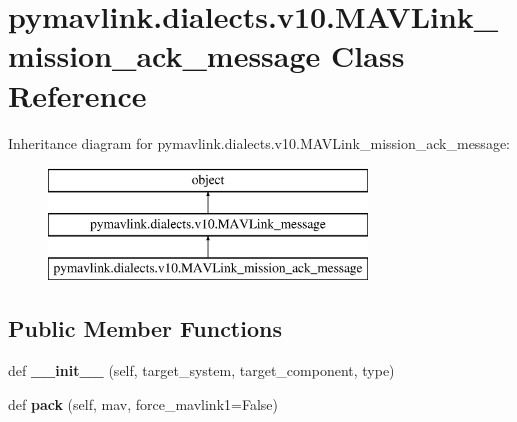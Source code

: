 \hypertarget{classpymavlink_1_1dialects_1_1v10_1_1MAVLink__mission__ack__message}{}\section{pymavlink.\+dialects.\+v10.\+M\+A\+V\+Link\+\_\+mission\+\_\+ack\+\_\+message Class Reference}
\label{classpymavlink_1_1dialects_1_1v10_1_1MAVLink__mission__ack__message}
Inheritance diagram for pymavlink.\+dialects.\+v10.\+M\+A\+V\+Link\+\_\+mission\+\_\+ack\+\_\+message\+:\begin{figure}[H]
\begin{center}
\leavevmode
\includegraphics[height=3.000000cm]{classpymavlink_1_1dialects_1_1v10_1_1MAVLink__mission__ack__message}
\end{center}
\end{figure}
\subsection*{Public Member Functions}
\begin{DoxyCompactItemize}
\item 
\mbox{\label{classpymavlink_1_1dialects_1_1v10_1_1MAVLink__mission__ack__message_ab05c68a5c8a7c002e9f042a15777d782}} 
def {\bfseries \+\_\+\+\_\+init\+\_\+\+\_\+} (self, target\+\_\+system, target\+\_\+component, type)
\item 
\mbox{\label{classpymavlink_1_1dialects_1_1v10_1_1MAVLink__mission__ack__message_aefde3cd09dae44292b34da5d83a074d0}} 
def {\bfseries pack} (self, mav, force\+\_\+mavlink1=False)
\end{DoxyCompactItemize}
